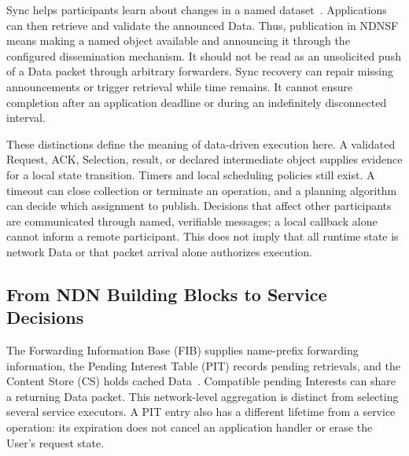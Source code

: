 Sync helps participants learn about changes in a named dataset~\cite{li2018brief,moll2022sok}. Applications can then retrieve and validate the announced Data. Thus, publication in NDNSF means making a named object available and announcing it through the configured dissemination mechanism. It should not be read as an unsolicited push of a Data packet through arbitrary forwarders. Sync recovery can repair missing announcements or trigger retrieval while time remains. It cannot ensure completion after an application deadline or during an indefinitely disconnected interval.

These distinctions define the meaning of data-driven execution here. A validated Request, ACK, Selection, result, or declared intermediate object supplies evidence for a local state transition. Timers and local scheduling policies still exist. A timeout can close collection or terminate an operation, and a planning algorithm can decide which assignment to publish. Decisions that affect other participants are communicated through named, verifiable messages; a local callback alone cannot inform a remote participant. This does not imply that all runtime state is network Data or that packet arrival alone authorizes execution.

\subsection{From NDN Building Blocks to Service Decisions}
The Forwarding Information Base (FIB) supplies name-prefix forwarding information, the Pending Interest Table (PIT) records pending retrievals, and the Content Store (CS) holds cached Data~\cite{yi2013case}. Compatible pending Interests can share a returning Data packet. This network-level aggregation is distinct from selecting several service executors. A PIT entry also has a different lifetime from a service operation: its expiration does not cancel an application handler or erase the User's request state.

